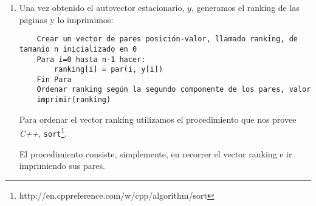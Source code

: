 \begin{enumerate}
	Los procedimientos auxiliares multiplicarMatrices, multiplicarMatrizPorVector y phi son procedimientos estándar, por lo cual no los detallamos.

	Normalizar un vector, en nuestra implementación, implica dividir cada componente del vector por la norma 1 del mismo.
	\item Una vez obtenido el autovector estacionario, $y$, generamos el ranking de las paginas y lo imprimimos:
	\begin{lstlisting}
	Crear un vector de pares posición-valor, llamado ranking, de tamanio n inicializado en 0
	Para i=0 hasta n-1 hacer:
		ranking[i] = par(i, y[i])
	Fin Para
	Ordenar ranking según la segundo componente de los pares, valor
	imprimir(ranking)
	\end{lstlisting}
	Para ordenar el vector ranking utilizamos el procedimiento que nos provee \textit{C++},  \texttt{sort}\footnote{http://en.cppreference.com/w/cpp/algorithm/sort}.

	El procedimiento consiste, simplemente, en recorrer el vector ranking e ir imprimiendo sus pares.
\end{enumerate}


